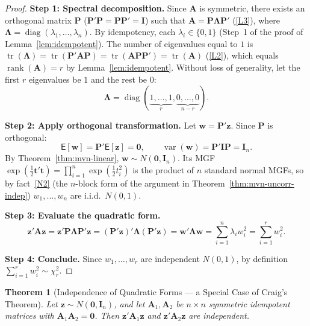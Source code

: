 \documentclass[14pt]{extarticle}
\theoremstyle{plain}
\newtheorem{theorem}{Theorem}[section]
\theoremstyle{definition}
\theoremstyle{remark}
\newcommand\expc{\mathsf{E}}
\DeclareMathOperator\var{var}
\DeclareMathOperator\tr{tr}
\DeclareMathOperator\rank{rank}
\DeclareMathOperator\diag{diag}
\newcommand{\bI}{\mathbf{I}}
\newcommand{\bzero}{\mathbf{0}}
\newcommand{\bz}{\mathbf{z}}
\newcommand{\bw}{\mathbf{w}}
\newcommand{\bA}{\mathbf{A}}
\newcommand{\bP}{\mathbf{P}}
\begin{document}
\begin{proof}
\textbf{Step 1: Spectral decomposition.} Since $\bA$ is symmetric, there exists an orthogonal matrix $\bP$ ($\bP'\bP = \bP\bP' = \bI$) such that $\bA = \bP\boldsymbol\Lambda\bP'$ (\ref{L3}), where $\boldsymbol\Lambda = \diag(\lambda_1, \ldots, \lambda_n)$. By idempotency, each $\lambda_i \in \{0, 1\}$ (Step~1 of the proof of Lemma~\ref{lem:idempotent}). The number of eigenvalues equal to $1$ is $\tr(\boldsymbol\Lambda) = \tr(\bP'\bA\bP) = \tr(\bA\bP\bP') = \tr(\bA)$ (\ref{L2}), which equals $\rank(\bA) = r$ by Lemma~\ref{lem:idempotent}. Without loss of generality, let the first $r$ eigenvalues be $1$ and the rest be $0$:
\[
\boldsymbol\Lambda = \diag(\underbrace{1, \ldots, 1}_{r}, \underbrace{0, \ldots, 0}_{n-r}).
\]

\textbf{Step 2: Apply orthogonal transformation.} Let $\bw = \bP'\bz$. Since $\bP$ is orthogonal:
\[
\expc[\bw] = \bP'\expc[\bz] = \bzero, \qquad \var(\bw) = \bP'\bI\bP = \bI_n.
\]
By Theorem~\ref{thm:mvn-linear}, $\bw \sim N(\bzero, \bI_n)$. Its MGF $\exp(\tfrac{1}{2}\mathbf{t}'\mathbf{t}) = \prod_{i=1}^n \exp(\tfrac{1}{2}t_i^2)$ is the product of $n$ standard normal MGFs, so by fact~\ref{N2} (the $n$-block form of the argument in Theorem~\ref{thm:mvn-uncorr-indep}) $w_1, \ldots, w_n$ are i.i.d.\ $N(0, 1)$.

\textbf{Step 3: Evaluate the quadratic form.}
\[
\bz'\bA\bz = \bz'\bP\boldsymbol\Lambda\bP'\bz = (\bP'\bz)'\boldsymbol\Lambda(\bP'\bz) = \bw'\boldsymbol\Lambda\bw = \sum_{i=1}^{n}\lambda_i w_i^2 = \sum_{i=1}^{r} w_i^2.
\]

\textbf{Step 4: Conclude.} Since $w_1, \ldots, w_r$ are independent $N(0, 1)$, by definition $\sum_{i=1}^{r} w_i^2 \sim \chi^2_r$.
\end{proof}

\begin{theorem}[Independence of Quadratic Forms --- a Special Case of Craig's Theorem]\label{thm:cochran}
Let $\bz \sim N(\bzero, \bI_n)$, and let $\bA_1, \bA_2$ be $n \times n$ symmetric idempotent matrices with $\bA_1\bA_2 = \bzero$. Then $\bz'\bA_1\bz$ and $\bz'\bA_2\bz$ are independent.
\end{theorem}
\end{document}

